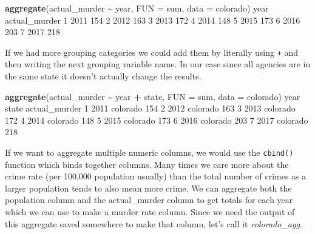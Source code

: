 \documentclass[
  12pt,
]{book}
\newenvironment{Shaded}{\begin{snugshade}}{\end{snugshade}}
\newcommand{\DataTypeTok}[1]{\textcolor[rgb]{0.27,0.27,0.27}{#1}}
\newcommand{\DecValTok}[1]{\textcolor[rgb]{0.06,0.06,0.06}{#1}}
\newcommand{\KeywordTok}[1]{\textcolor[rgb]{0.27,0.27,0.27}{\textbf{#1}}}
\newcommand{\NormalTok}[1]{#1}
\newcommand{\OperatorTok}[1]{\textcolor[rgb]{0.43,0.43,0.43}{\textbf{#1}}}
\newcommand{\StringTok}[1]{\textcolor[rgb]{0.5,0.5,0.5}{#1}}
\begin{document}
\begin{Shaded}
\begin{Highlighting}[]
\KeywordTok{aggregate}\NormalTok{(actual\_murder }\OperatorTok{\textasciitilde{}}\StringTok{ }\NormalTok{year, }\DataTypeTok{FUN =}\NormalTok{ sum, }\DataTypeTok{data =}\NormalTok{ colorado)}
\NormalTok{  year actual\_murder}
\DecValTok{1} \DecValTok{2011}           \DecValTok{154}
\DecValTok{2} \DecValTok{2012}           \DecValTok{163}
\DecValTok{3} \DecValTok{2013}           \DecValTok{172}
\DecValTok{4} \DecValTok{2014}           \DecValTok{148}
\DecValTok{5} \DecValTok{2015}           \DecValTok{173}
\DecValTok{6} \DecValTok{2016}           \DecValTok{203}
\DecValTok{7} \DecValTok{2017}           \DecValTok{218}
\end{Highlighting}
\end{Shaded}

If we had more grouping categories we could add them by literally using \texttt{+} and then writing the next grouping variable name. In our case since all agencies are in the same state it doesn't actually change the results.

\begin{Shaded}
\begin{Highlighting}[]
\KeywordTok{aggregate}\NormalTok{(actual\_murder }\OperatorTok{\textasciitilde{}}\StringTok{ }\NormalTok{year }\OperatorTok{+}\StringTok{ }\NormalTok{state, }\DataTypeTok{FUN =}\NormalTok{ sum, }\DataTypeTok{data =}\NormalTok{ colorado)}
\NormalTok{  year    state actual\_murder}
\DecValTok{1} \DecValTok{2011}\NormalTok{ colorado           }\DecValTok{154}
\DecValTok{2} \DecValTok{2012}\NormalTok{ colorado           }\DecValTok{163}
\DecValTok{3} \DecValTok{2013}\NormalTok{ colorado           }\DecValTok{172}
\DecValTok{4} \DecValTok{2014}\NormalTok{ colorado           }\DecValTok{148}
\DecValTok{5} \DecValTok{2015}\NormalTok{ colorado           }\DecValTok{173}
\DecValTok{6} \DecValTok{2016}\NormalTok{ colorado           }\DecValTok{203}
\DecValTok{7} \DecValTok{2017}\NormalTok{ colorado           }\DecValTok{218}
\end{Highlighting}
\end{Shaded}

If we want to aggregate multiple numeric columns, we would use the \texttt{cbind()} function which binds together columns. Many times we care more about the crime rate (per 100,000 population usually) than the total number of crimes as a larger population tends to also mean more crime. We can aggregate both the population column and the actual\_murder column to get totals for each year which we can use to make a murder rate column. Since we need the output of this aggregate saved somewhere to make that column, let's call it \emph{colorado\_agg}.
\end{document}
